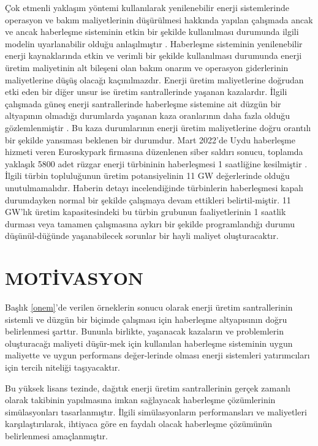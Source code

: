 Çok etmenli yaklaşım yöntemi kullanılarak yenilenebilir enerji sistemlerinde operasyon ve bakım maliyetlerinin düşürülmesi hakkında yapılan çalışmada ancak ve ancak haberleşme sisteminin etkin bir şekilde kullanılması durumunda ilgili modelin uyarlanabilir olduğu anlaşılmıştır \cite{7804974}. 
Haberleşme sisteminin yenilenebilir enerji kaynaklarında etkin ve verimli bir şekilde kullanılması durumunda enerji üretim maliyetinin alt bileşeni olan bakım onarım ve operasyon giderlerinin maliyetlerine düşüş olacağı kaçınılmazdır.
Enerji üretim maliyetlerine doğrudan etki eden bir diğer unsur ise üretim santrallerinde yaşanan kazalardır. İlgili çalışmada güneş enerji santrallerinde haberleşme sistemine ait düzgün bir altyapının olmadığı durumlarda yaşanan kaza oranlarının daha fazla olduğu gözlemlenmiştir \cite{https://doi.org/10.1002/dac.4517}. Bu kaza durumlarının enerji üretim maliyetlerine doğru orantılı bir şekilde yansıması beklenen bir durumdur.
Mart 2022'de Uydu haberleşme hizmeti veren Euroskypark firmasına düzenlenen siber saldırı sonucu, toplamda yaklaşık 5800 adet rüzgar enerji türbininin haberleşmesi 1 saatliğine kesilmiştir \cite{sibersaldiri}. İlgili türbin topluluğunun üretim potansiyelinin 11 GW değerlerinde olduğu unutulmamalıdır. Haberin detayı incelendiğinde türbinlerin haberleşmesi kapalı durumdayken normal bir şekilde çalışmaya devam ettikleri belirtil-miştir. 11 GW'lık üretim kapasitesindeki bu türbin grubunun faaliyetlerinin 1 saatlik durması veya tamamen çalışmasına aykırı bir şekilde programlandığı durumu düşünül-düğünde yaşanabilecek sorunlar bir hayli maliyet oluşturacaktır.




\section{MOTİVASYON} \label{motivasyon}



Başlık \ref{onem}'de verilen örneklerin sonucu olarak enerji üretim santrallerinin sistemli ve düzgün bir biçimde çalışması için haberleşme altyapısının doğru belirlenmesi şarttır. Bununla birlikte, yaşanacak kazaların ve problemlerin oluşturacağı maliyeti düşür-mek için kullanılan haberleşme sisteminin uygun maliyette ve uygun performans değer-lerinde olması enerji sistemleri yatırımcıları için tercih niteliği taşıyacaktır.

Bu yüksek lisans tezinde, dağıtık enerji üretim santrallerinin gerçek zamanlı olarak takibinin yapılmasına imkan sağlayacak haberleşme çözümlerinin simülasyonları tasarlanmıştır. İlgili simülasyonların performansları ve maliyetleri karşılaştırılarak, ihtiyaca göre en faydalı olacak haberleşme çözümünün belirlenmesi amaçlanmıştır.


